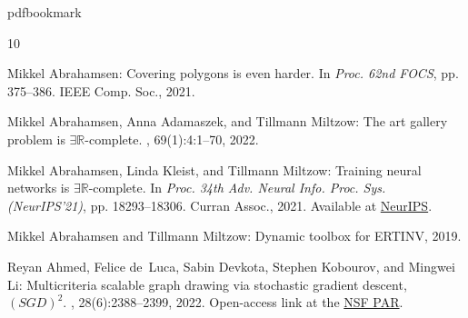 \newcommand{\prelim}{Preliminary version in\ }\newcommand{\prelims}{Preliminary
  versions in\ }
\providecommand{\bibhead}[1]{}
\expandafter\ifx\csname pdfbookmark\endcsname\relax%
  \providecommand{\tocrefpdfbookmark}{}
\else\providecommand{\tocrefpdfbookmark}{%
   \hypertarget{tocreferences}{}%
   \pdfbookmark[1]{References}{tocreferences}}%
\fi

\tocrefpdfbookmark
\begin{thebibliography}{10}

\bibhead{Abrahamsen2022_Covering}
{\sc Mikkel Abrahamsen}: Covering polygons is even harder.
\newblock In {\em Proc. 62nd FOCS}, pp. 375--386. IEEE Comp. Soc., 2021.

\bibhead{Abrahamsen2022_ArtGallery}
{\sc Mikkel Abrahamsen, Anna Adamaszek, and Tillmann Miltzow}: The art gallery
  problem is $\exists\mathbb{R}$-complete.
, 69(1):4:1--70, 2022.
\newblock [\epfmtdoi{10.1145/3486220}]

\bibhead{Abrahamsen2021_NeuralNetworks}
{\sc Mikkel Abrahamsen, Linda Kleist, and Tillmann Miltzow}: Training neural
  networks is $\exists\mathbb{R}$-complete.
\newblock In {\em Proc. 34th Adv. Neural Info. Proc. Sys. (NeurIPS'21)}, pp.
  18293--18306. Curran Assoc., 2021.
\newblock Available at
  \href{https://papers.nips.cc/paper_files/paper/2021/hash/9813b270ed0288e7c0388f0fd4ec68f5-Abstract.html}{NeurIPS}.

\bibhead{Abrahamsen2019_Toolbox}
{\sc Mikkel Abrahamsen and Tillmann Miltzow}: Dynamic toolbox for {ERTINV},
  2019.

\bibhead{Ahmed2022_GraphDrawingGD}
{\sc Reyan Ahmed, Felice de~Luca, Sabin Devkota, Stephen Kobourov, and Mingwei
  Li}: Multicriteria scalable graph drawing via stochastic gradient descent,
  $({SGD})^2$.
, 28(6):2388--2399,
  2022.
\newblock Open-access link at the
  \href{https://par.nsf.gov/servlets/purl/10354872}{NSF PAR}.


\end{thebibliography}
